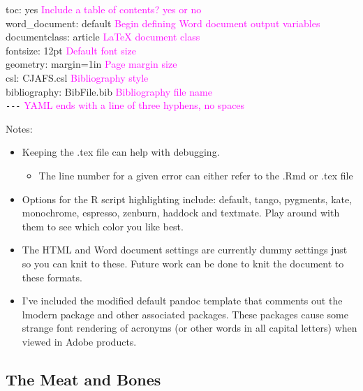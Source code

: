 \documentclass[12pt,]{article}
\providecommand{\tightlist}{%
  \setlength{\itemsep}{0pt}\setlength{\parskip}{0pt}}
\begin{document}
toc: yes \textcolor{magenta}{Include a table of contents? yes or no}\\
\hspace*{0.333em}\hspace*{0.333em} word\_document: default
\textcolor{magenta}{Begin defining Word document output variables}\\
documentclass: article \textcolor{magenta}{LaTeX document class}\\
fontsize: 12pt \textcolor{magenta}{Default font size}\\
geometry: margin=1in \textcolor{magenta}{Page margin size}\\
csl: CJAFS.csl \textcolor{magenta}{Bibliography style}\\
bibliography: BibFile.bib \textcolor{magenta}{Bibliography file name}\\
\texttt{-\/-\/-}
\textcolor{magenta}{YAML ends with a line of three hyphens, no spaces}

Notes:

\begin{itemize}
\item
  Keeping the .tex file can help with debugging.

  \begin{itemize}
  \tightlist
  \item
    The line number for a given error can either refer to the .Rmd or
    .tex file
  \end{itemize}
\item
  Options for the R script highlighting include: default, tango,
  pygments, kate, monochrome, espresso, zenburn, haddock and textmate.
  Play around with them to see which color you like best.
\item
  The HTML and Word document settings are currently dummy settings just
  so you can knit to these. Future work can be done to knit the document
  to these formats.
\item
  I've included the modified default pandoc template that comments out
  the lmodern package and other associated packages. These packages
  cause some strange font rendering of acronyms (or other words in all
  capital letters) when viewed in Adobe products.
\end{itemize}

\subsection{The Meat and Bones}\label{the-meat-and-bones}
\end{document}
